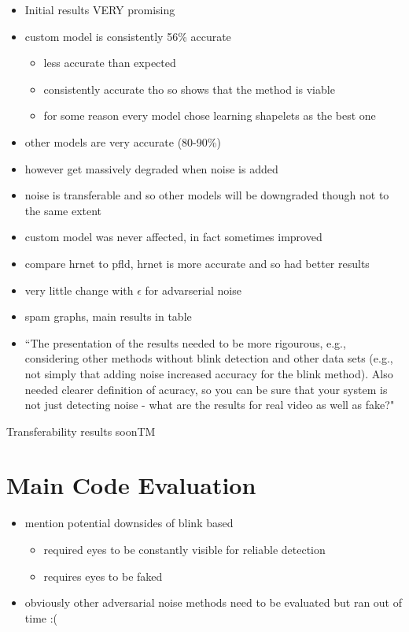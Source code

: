 \begin{itemize}
    \item Initial results VERY promising
    \item custom model is consistently 56\% accurate
    \begin{itemize}
        \item less accurate than expected
        \item consistently accurate tho so shows that the method is viable
        \item for some reason every model chose learning shapelets as the best one
    \end{itemize}
    \item other models are very accurate (80-90\%)
    \item however get massively degraded when noise is added
    \item noise is transferable and so other models will be downgraded though not to the same extent
    \item custom model was never affected, in fact sometimes improved
    \item compare hrnet to pfld, hrnet is more accurate and so had better results
    \item very little change with $\epsilon$ for advarserial noise
    \item spam graphs, main results in table
    \item ``The presentation of the results needed to be more rigourous, e.g., considering other methods without blink detection and other data sets (e.g., not simply that adding noise increased accuracy for the blink method). Also needed clearer definition of acuracy, so you can be sure that your system is not just detecting noise - what are the results for real video as well as fake?"
\end{itemize}

Transferability results soonTM

\section{Main Code Evaluation}

\begin{itemize}
    \item mention potential downsides of blink based
    \begin{itemize}
        \item required eyes to be constantly visible for reliable detection
        \item requires eyes to be faked
    \end{itemize}
    \item obviously other adversarial noise methods need to be evaluated but ran out of time :(
\end{itemize}